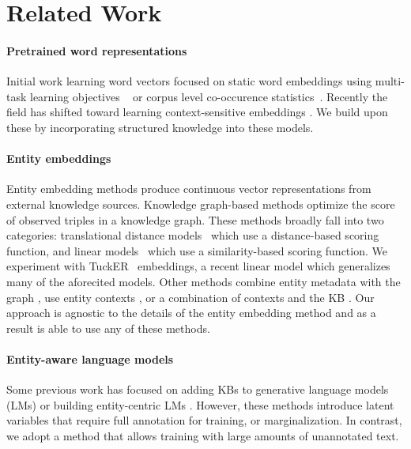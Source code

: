 \documentclass[11pt,a4paper]{article}
\begin{document}
\section{Related Work}

\paragraph{Pretrained word representations}
Initial work learning word vectors focused on static word embeddings using multi-task learning objectives ~\cite{collobert2008unified} or
corpus level co-occurence statistics~\cite{mikolov2013efficient,Pennington2014GloveGV}.
Recently the field has shifted toward learning context-sensitive embeddings \cite{Dai2015SemisupervisedSL, Mccann2017, Peters2018, Devlin2018}.
We build upon these by incorporating structured knowledge into these models.

\paragraph{Entity embeddings}
Entity embedding methods produce continuous vector representations from external knowledge sources.
Knowledge graph-based methods optimize the score of observed triples in a knowledge graph.
These methods broadly fall into two categories: translational distance models~\cite{bordes2013translating,wang2014knowledge,lin2015learning,xiao2016one} which use a distance-based scoring function, and linear models~\cite{nickel2011three,yang2014embedding,trouillon2016complex,dettmers2018convolutional} which use a similarity-based scoring function.
We experiment with TuckER~\cite{Balazevic2019TuckERTF} embeddings, a recent linear model which generalizes many of the aforecited models.
Other methods combine entity metadata with the graph \cite{Xie2016RepresentationLO}, use entity contexts \cite{Chen2014AUM,Ganea2017DeepJE}, or a combination of contexts and the KB \cite{Wang2014KnowledgeGA,Gupta2017EntityLV}.
Our approach is agnostic to the details of the entity embedding method and as a result is able to use any of these methods.

\paragraph{Entity-aware language models}
Some previous work has focused on adding KBs to generative language models (LMs) \cite{Ahn2017ANK,yang2016reference,Logan2019BaracksWH} or building entity-centric LMs \cite{ji2017dynamic}.  However, these methods introduce latent variables that require full annotation for training, or marginalization.
In contrast, we adopt a method that allows training with large amounts of unannotated text.
\end{document}
